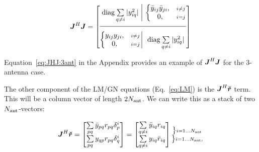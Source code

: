 \documentclass[useAMS,usenatbib]{mn2e}
\makeatletter
\newcommand{\mat}[1]{{\bmath{#1}}}
\newcommand{\JJ}{\mat{J}} %
\newcommand{\Matrix}[2]{\left [ \begin{array}{@{}#1@{}}#2\end{array} \right ]}
\newcommand{\Stack}[1]{\begin{array}{@{}c@{}}#1\end{array}}
\newcommand{\AUG}[1]{\bmath{\breve{#1}}}
\newcommand{\Rr}{\AUG{r}}
\makeatother
\begin{document}
\begin{equation}
\label{eq:JHJ:DI}
\JJ^H \JJ = 
\JHJblocksFull{
\mathrm{diag} \sum\limits_{q\ne i} |y_{iq}^2| 
}{
  \left \{ 
  \begin{array}{@{}cc@{}}
   \bar{y}_{ij} \bar{y}_{ji}, &{\scriptstyle i\ne j} \\
   0, &{\scriptstyle i=j}
  \end{array} \right .
}{
  \left \{ 
  \begin{array}{@{}cc@{}}
   y_{ij}y_{ji},&{\scriptstyle i\ne j} \\
   0, &{\scriptstyle i=j}
  \end{array} \right . 
}{
  \mathrm{diag} \sum\limits_{q\ne i} |y^2_{iq}| 
}
\end{equation}

Equation~\ref{eq:JHJ:3ant} in the Appendix provides an example of $\JJ^H\JJ$ for the 3-antenna case. 

\newcommand{\yysq}[2]{{y^2_{#1}+y^2_{#2}}}
\newcommand{\bb}[2]{{\bar{y}_{#1#2}\bar{y}_{#2#1}}}
\newcommand{\bbb}[2]{y_{#1#2}y_{#2#1}}

The other component of the LM/GN equations (Eq.~\ref{eq:LM}) is the $\JJ^H\Rr$ term. This will be a column vector of length $2N_\mathrm{ant}$. We can write this as a stack of two $N_\mathrm{ant}$-vectors:


\begin{equation}
\label{eq:JHR:DI}
\JJ^H\Rr = \Matrix{c}{ 
\sum\limits_{pq} \bar{y}_{pq} r_{pq} \delta^{i}_p  \\
\sum\limits_{pq} y_{qp} r_{pq} \delta^{i}_q 
} = \Matrix{c}{
\sum\limits_{q\ne i} \bar{y}_{iq} r_{iq}   \\
\sum\limits_{q\ne i} y_{iq} \bar{r}_{iq}  
}
\Stack{
\big \} \scriptstyle i=1\dots \Na \\ 
\big \} \scriptstyle i=1\dots \Na,
}
\end{equation}
\end{document}
